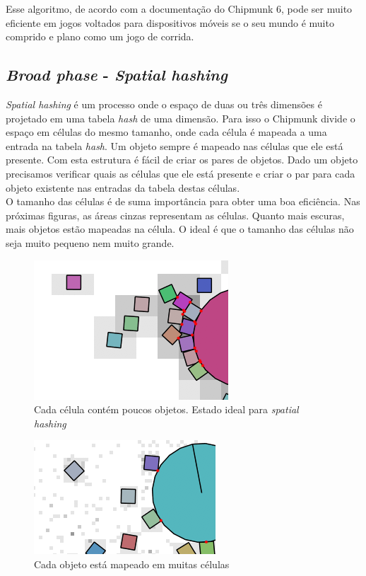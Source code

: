 Esse algoritmo, de acordo com a documentação do Chipmunk 6, pode ser muito eficiente em jogos voltados para dispositivos móveis se o seu mundo é muito comprido 
e plano como um jogo de corrida.

\subsection{\textit{Broad phase} - \textit{Spatial hashing}}

\textit{Spatial hashing} é um processo onde o espaço de duas ou três dimensões é projetado em uma tabela \textit{hash} de uma dimensão. Para isso o Chipmunk divide o espaço em 
células do mesmo tamanho, onde cada célula é mapeada a uma entrada na tabela \textit{hash}. Um objeto sempre é mapeado nas células que ele está presente. Com esta estrutura 
  é fácil de criar os pares de objetos. Dado um objeto precisamos verificar quais as células que ele está presente e criar o par para cada objeto existente nas 
entradas da tabela destas células.\\

O tamanho das células é de suma importância para obter uma boa eficiência. Nas próximas figuras, as áreas cinzas representam as células. Quanto mais escuras, mais objetos estão mapeadas na célula. O ideal é que o tamanho das células não seja muito pequeno nem muito grande.\\

\begin{figure}[!htbp]
  \centering
  \includegraphics[scale=1]{hash_just_right.png}
  \caption{Cada célula contém poucos objetos. Estado ideal para \textit{spatial hashing} \protect\cite{Chipmunk:image1}}
\end{figure}

\begin{figure}[!htbp]
  \centering
  \includegraphics[scale=1]{hash_too_small.png}
  \caption{Cada objeto está mapeado em muitas células \protect\cite{Chipmunk:image2}}
\end{figure}

